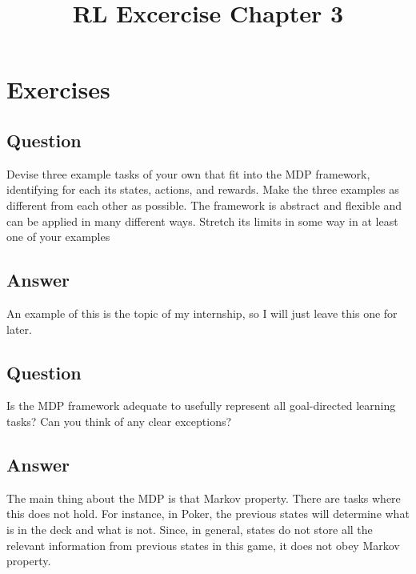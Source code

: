 \documentclass[11pt]{article}
\title{RL Excercise Chapter 3}
\begin{document}
    \maketitle
    \setcounter{section}{2}


    \section{Exercises}

    \subsection{Question}
    Devise three example tasks of your own that fit into the MDP framework,
    identifying for each its states, actions, and rewards. Make the three examples as different from each other as possible. The framework is abstract and flexible and can be applied in
    many different ways. Stretch its limits in some way in at least one of your examples

    \subsection*{Answer}

    An example of this is the topic of my internship, so I will just leave this one for later.

    \subsection{Question}
    Is the MDP framework adequate to usefully represent all goal-directed learning tasks?
    Can you think of any clear exceptions?


    \subsection*{Answer}
    The main thing about the MDP is that Markov property. There are tasks where this does not hold. For instance, in Poker, the previous states will determine what is in the deck and what is not. Since, in general, states do not store all the relevant information from previous states in this game, it does not obey Markov property.
\end{document}
